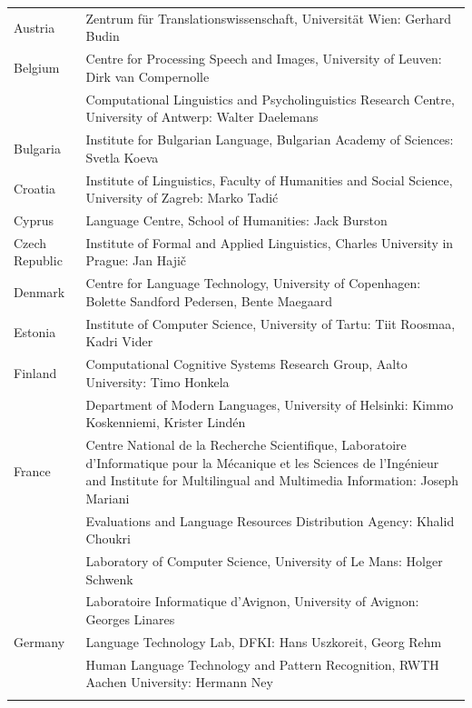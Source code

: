 \begin{longtable}{@{}lp{137mm}@{}}
Austria & Zentrum für Translationswissenschaft, Universität Wien: Gerhard Budin\\ \addlinespace 
Belgium & Centre for Processing Speech and Images, University of Leuven: Dirk van Compernolle \\ \addlinespace
& Computational Linguistics and Psycholinguistics Research Centre, University of Antwerp: \newline Walter Daelemans\\ \addlinespace
Bulgaria & Institute for Bulgarian Language, Bulgarian Academy of Sciences: Svetla Koeva \\ \addlinespace
Croatia & Institute of Linguistics, Faculty of Humanities and Social Science, University of Zagreb: Marko Tadić \\ \addlinespace
Cyprus & Language Centre, School of Humanities: Jack Burston \\ \addlinespace
Czech Republic & Institute of Formal and Applied Linguistics, Charles University in Prague: Jan Hajič \\ \addlinespace
Denmark & Centre for Language Technology, University of Copenhagen: Bolette Sandford Pedersen, \newline Bente Maegaard\\ \addlinespace
Estonia & Institute of Computer Science, University of Tartu: Tiit Roosmaa, Kadri Vider\\ \addlinespace
Finland & Computational Cognitive Systems Research Group, Aalto University: Timo Honkela\\ \addlinespace
& Department of Modern Languages, University of Helsinki: Kimmo Koskenniemi, Krister Lindén \\ \addlinespace
France & Centre National de la Recherche Scientifique, Laboratoire d'Informatique pour la Mécanique et les Sciences de l'Ingénieur and Institute for Multilingual and Multimedia Information: Joseph Mariani \\ \addlinespace
& Evaluations and Language Resources Distribution Agency: Khalid Choukri\\ \addlinespace
& Laboratory of Computer Science, University of Le Mans: Holger Schwenk\\ \addlinespace
& Laboratoire Informatique d'Avignon, University of Avignon: Georges Linares\\ \addlinespace
Germany & Language Technology Lab, DFKI: Hans Uszkoreit, Georg Rehm\\ \addlinespace 
& Human Language Technology and Pattern Recognition, RWTH Aachen University: Hermann Ney \\ \addlinespace 

\end{longtable}
